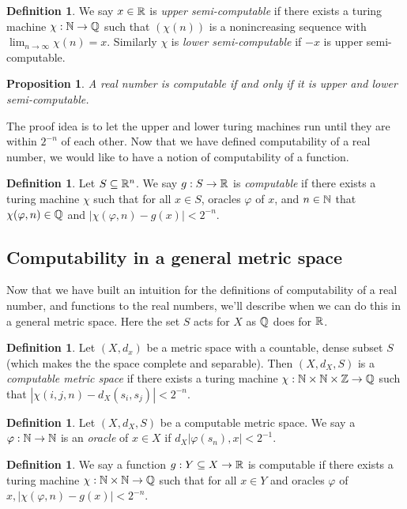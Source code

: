 \documentclass[11pt, reqno]{amsart}
\theoremstyle{plain}
\numberwithin{thm}{subsection}
\newtheorem{prop}[thm]{Proposition}
\theoremstyle{definition}
\newtheorem{defn}[thm]{Definition}
\begin{document}
\begin{defn}
  We say $x \in \mathbb{R}$ is \textit{upper semi-computable} if there exists a turing machine $\chi: \mathbb{N} \rightarrow \mathbb{Q}$ such that $(\chi(n))$ is a nonincreasing sequence with $\lim_{n \rightarrow \infty} \chi(n) = x$.
  Similarly $\chi$ is \textit{lower semi-computable} if $-x$ is upper semi-computable.
\end{defn}

\begin{prop}
  A real number is computable if and only if it is upper and lower semi-computable.
\end{prop}
The proof idea is to let the upper and lower turing machines run until they are within $2^{-n}$ of each other. Now that we have defined computability of a real number, we would like to have a notion of computability of a function.

\begin{defn}
    Let $S \subseteq \mathbb{R}^n$. We say $g: S \rightarrow \mathbb{R}$ is \textit{computable} if there exists a turing machine $\chi$ such that for all $x \in S$, oracles $\varphi$ of $x$, and $n \in \mathbb{N}$ that $\chi(\varphi, n) \in \mathbb{Q}$ and $|\chi(\varphi, n) - g(x)| < 2^{-n}$.
\end{defn}

\subsection{Computability in a general metric space}
Now that we have built an intuition for the definitions of computability of a real number, and functions to the real numbers, we'll describe when we can do this in a general metric space. Here the set $S$ acts for $X$ as $\mathbb{Q}$ does for $\mathbb{R}$. 

\begin{defn}
  Let $(X, d_x)$ be a metric space with a countable, dense subset $S$ (which makes the the space complete and separable). Then $(X, d_X, S)$ is a \textit{computable metric space} if there exists a turing machine $\chi: \mathbb{N}\times\mathbb{N} \times \mathbb{Z} \rightarrow \mathbb{Q}$ such that $|\chi(i,j,n) - d_X(s_i, s_j)| < 2^{-n}$.
\end{defn}

\begin{defn}
  Let $(X, d_X, S)$ be a computable metric space. We say a $\varphi: \mathbb{N} \rightarrow \mathbb{N}$ is an \textit{oracle} of $x \in X$ if $d_X|\varphi(s_n), x| < 2^{-1}$. 
\end{defn}

\begin{defn}
  We say a function $g: Y \subseteq X \rightarrow \mathbb{R}$ is computable if there exists a turing machine $\chi: \mathbb{N} \times \mathbb{N} \rightarrow \mathbb{Q}$ such that for all $x \in Y$ and oracles $\varphi$ of $x, |\chi(\varphi,n)-g(x)| < 2^{-n}$.
\end{defn}
\end{document}

